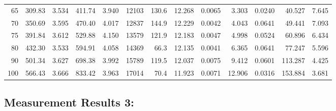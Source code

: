 \documentclass[10pt]{article}
\begin{document}
{\begin{tabular}{|r|rr|rr|rr|rr|rr|r|r|}
       65 &       309.83 &        3.534 &       411.74 &        3.940 &        12103 &        130.6 &       12.268 &       0.0065 &        3.303 &       0.0240 &       40.527 &        7.645 \\
       70 &       350.69 &        3.595 &       470.40 &        4.017 &        12837 &        144.9 &       12.229 &       0.0042 &        4.043 &       0.0641 &       49.441 &        7.093 \\
       75 &       391.84 &        3.612 &       529.88 &        4.150 &        13579 &        121.9 &       12.183 &       0.0047 &        4.998 &       0.0524 &       60.896 &        6.434 \\
       80 &       432.30 &        3.533 &       594.91 &        4.058 &        14369 &         66.3 &       12.135 &       0.0041 &        6.365 &       0.0641 &       77.247 &        5.596 \\
       90 &       501.34 &        3.627 &       698.38 &        3.992 &        15789 &        119.5 &       12.037 &       0.0075 &        9.412 &       0.0601 &      113.287 &        4.425 \\
      100 &       566.43 &        3.666 &       833.42 &        3.963 &        17014 &         70.4 &       11.923 &       0.0071 &       12.906 &       0.0316 &      153.884 &        3.681 \\
\hline
\end{tabular}
}



\subsection*{\large \bf Measurement Results 3:}
\end{document}
